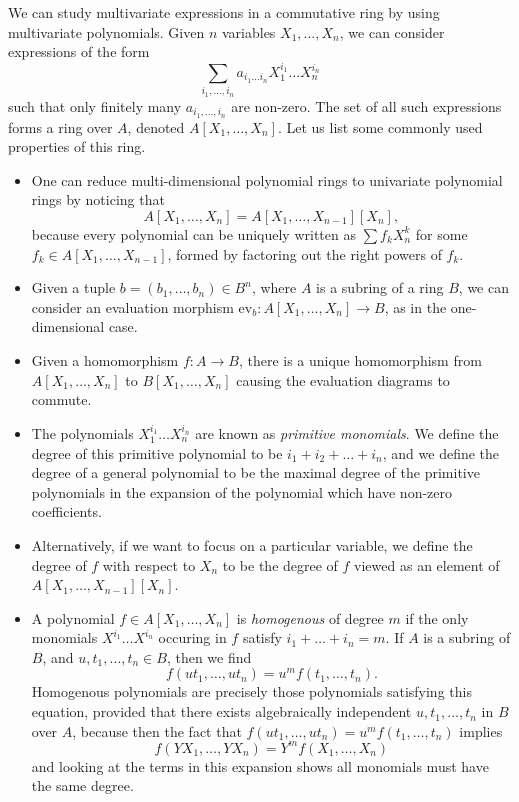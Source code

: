 We can study multivariate expressions in a commutative ring by using multivariate polynomials. Given $n$ variables $X_1, \dots, X_n$, we can consider expressions of the form
%
\[ \sum_{i_1, \dots, i_n} a_{i_1 \dots i_n} X_1^{i_1} \dots X_n^{i_n} \]
%
such that only finitely many $a_{i_1, \dots, i_n}$ are non-zero. The set of all such expressions forms a ring over $A$, denoted $A[X_1, \dots, X_n]$. Let us list some commonly used properties of this ring.
%
\begin{itemize}
    \item One can reduce multi-dimensional polynomial rings to univariate polynomial rings by noticing that
    \[ A[X_1, \dots, X_n] = A[X_1, \dots, X_{n-1}][X_n], \]
    because every polynomial can be uniquely written as $\sum f_k X_n^k$ for some $f_k \in A[X_1, \dots, X_{n-1}]$, formed by factoring out the right powers of $f_k$.

    \item Given a tuple $b = (b_1, \dots, b_n) \in B^n$, where $A$ is a subring of a ring $B$, we can consider an evaluation morphism $\text{ev}_b: A[X_1, \dots, X_n] \to B$, as in the one-dimensional case.

    \item Given a homomorphism $f: A \to B$, there is a unique homomorphism from $A[X_1, \dots, X_n]$ to $B[X_1, \dots, X_n]$ causing the evaluation diagrams to commute.

    \item The polynomials $X_1^{i_1} \dots X_n^{i_n}$ are known as {\it primitive monomials}. We define the degree of this primitive polynomial to be $i_1 + i_2 + \dots + i_n$, and we define the degree of a general polynomial to be the maximal degree of the primitive polynomials in the expansion of the polynomial which have non-zero coefficients. 

    \item Alternatively, if we want to focus on a particular variable, we define the degree of $f$ with respect to $X_n$ to be the degree of $f$ viewed as an element of $A[X_1, \dots, X_{n-1}][X_n]$.

    \item A polynomial $f \in A[X_1, \dots, X_n]$ is {\it homogenous} of degree $m$ if the only monomials $X^{i_1} \dots X^{i_n}$ occuring in $f$ satisfy $i_1 + \dots + i_n = m$. If $A$ is a subring of $B$, and $u,t_1, \dots, t_n \in B$, then we find
    \[ f(ut_1, \dots, ut_n) = u^m f(t_1, \dots, t_n). \]
    Homogenous polynomials are precisely those polynomials satisfying this equation, provided that there exists algebraically independent $u, t_1, \dots, t_n$ in $B$ over $A$, because then the fact that $f(ut_1, \dots, ut_n) = u^m f(t_1, \dots, t_n)$ implies
    \[ f(YX_1, \dots, YX_n) = Y^m f(X_1, \dots, X_n) \]
    and looking at the terms in this expansion shows all monomials must have the same degree.
\end{itemize}

